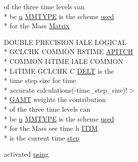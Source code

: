 \begin{DoxyCompactItemize}
of the three time levels can \\*
be \hyperlink{time_8com_a59787df2891338b611ba3a1096154aa3}{n} \hyperlink{time_8com_a7cab4e82cd8529facf6a2802f81887ff}{M\-M\-T\-Y\-P\-E} is the scheme \hyperlink{streamplasma_8com_ae33ecc71599b4338146f31d68e60c328}{used} \\*
for the Mass \hyperlink{time_8com_a04b69bf706ac5ad697f30180a0614468}{Matrix}
\item 
D\-O\-U\-B\-L\-E P\-R\-E\-C\-I\-S\-I\-O\-N I\-A\-L\-E L\-O\-G\-I\-C\-A\-L \\*
G\-C\-L\-C\-H\-K C\-O\-M\-M\-O\-N R8\-T\-I\-M\-E \hyperlink{time_8com_a45717e5c9ccf2afd6bb9e4efe67c74e6}{A\-P\-I\-T\-C\-H} \\*
C\-O\-M\-M\-O\-N I4\-T\-I\-M\-E I\-A\-L\-E C\-O\-M\-M\-O\-N \\*
L4\-T\-I\-M\-E G\-C\-L\-C\-H\-K C \hyperlink{time_8com_a5513a2d02244417f197860f9d142b7a4}{D\-E\-L\-T} is the \\*
time step size for time \\*
accurate calculations(-\/time\-\_\-step\-\_\-size)!$>$\\*
 \hyperlink{time_8com_afdf546d0ac261dc8969599f6c2786ea3}{G\-A\-M\-T} weights the contribution \\*
of the three time levels can \\*
be \hyperlink{time_8com_a59787df2891338b611ba3a1096154aa3}{n} \hyperlink{time_8com_a7cab4e82cd8529facf6a2802f81887ff}{M\-M\-T\-Y\-P\-E} is the scheme \hyperlink{streamplasma_8com_ae33ecc71599b4338146f31d68e60c328}{used} \\*
for the Mass see time h \hyperlink{time_8com_a05b1a0581c155d7e49853c3808fe94c9}{I\-T\-I\-M} \\*
is the current time \hyperlink{time_8com_a91e550adb29e949f38f0252aa68aceed}{step}
\item 
activated \hyperlink{time_8com_a6460305cce7c549ad9964e2a1f3f8dec}{using}
\end{DoxyCompactItemize}



